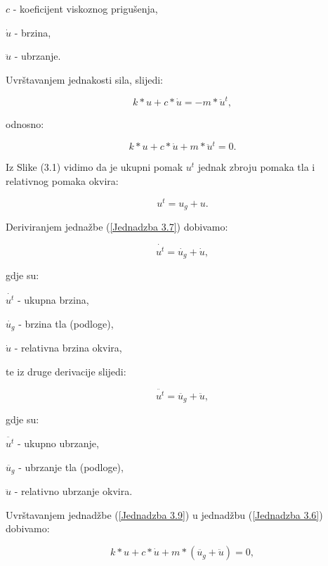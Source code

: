 \documentclass[12pt]{book}
\begin{document}
$c$ - koeficijent viskoznog prigušenja,

$\dot{u}$ - brzina,

$\ddot{u}$ - ubrzanje.

\newpage

Uvrštavanjem jednakosti sila, slijedi:

\begin{equation}\label{Jednadzba 3.5}
	k*u + c*\dot{u} = - m*\ddot{u}^t,
\end{equation}

odnosno:

\begin{equation}\label{Jednadzba 3.6}
	k*u + c*\dot{u} + m*\ddot{u}^t =0.
\end{equation}

Iz Slike (3.1) vidimo da je ukupni pomak $u^t$ jednak zbroju pomaka tla i relativnog pomaka okvira:

\begin{equation}\label{Jednadzba 3.7}
	u^t = u_g + u.
\end{equation}

Deriviranjem jednažbe (\ref{Jednadzba 3.7}) dobivamo:

\begin{equation}\label{Jednadzba 3.8}
	\dot{u^t} = \dot{u_g} + \dot{u},
\end{equation}

gdje su:

$\dot{u^t}$ - ukupna brzina,

$\dot{u_g}$ - brzina tla (podloge),

$\dot{u}$ - relativna brzina okvira,

te iz druge derivacije slijedi:

\begin{equation}\label{Jednadzba 3.9}
	\ddot{u^t} = \ddot{u_g} + \ddot{u},
\end{equation}

gdje su:

$\ddot{u^t}$ - ukupno ubrzanje,

$\ddot{u_g}$ - ubrzanje tla (podloge),

$\ddot{u}$ - relativno ubrzanje okvira.

Uvrštavanjem jednadžbe (\ref{Jednadzba 3.9}) u jednadžbu (\ref{Jednadzba 3.6}) dobivamo:

\begin{equation}\label{Jednadzba 3.10}
	k*u + c*\dot{u} + m*(\ddot{u_g} + \ddot{u}) = 0,
\end{equation}
\end{document}

